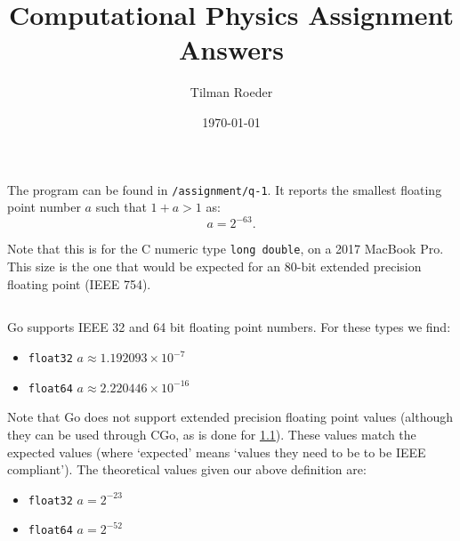 \documentclass[10pt, a4paper]{article}
\title{Computational Physics Assignment Answers}
\author{Tilman Roeder}
\date{\today}
\begin{document}
\maketitle

\section{}

  \subsection{}
  \label{sec:cgo}
  The program can be found in \texttt{/assignment/q-1}. It reports the smallest floating point number
  $a$ such that $1 + a > 1$ as\footnotemark{}:
  \begin{equation}
    a = 2^{-63}.
  \end{equation}

  Note that this is for the C numeric type \texttt{long double}, on a 2017 MacBook Pro. This size
  is the one that would be expected for an 80-bit extended precision floating point (IEEE 754).

  \subsection{}
  Go supports IEEE 32 and 64 bit floating point numbers. For these types we find:
  \begin{itemize}
    \item \texttt{float32} $a \approx 1.192093 \times 10^{-7}$
    \item \texttt{float64} $a \approx 2.220446 \times 10^{-16}$
  \end{itemize}

  Note that Go does not support extended precision floating point values (although they can be used through
  CGo, as is done for \ref{sec:cgo}). These values match the expected values (where `expected' means `values
  they need to be to be IEEE compliant'). The theoretical values given our above definition are:
  \begin{itemize}
    \item \texttt{float32} $a = 2^{-23}$
    \item \texttt{float64} $a = 2^{-52}$
  \end{itemize}

\end{document}

